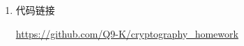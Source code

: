 \chapter{}
\label{chapter-faq}
\begin{enumerate}
\item 代码链接

    \url{https://github.com/Q9-K/cryptography_homework}
\end{enumerate}
